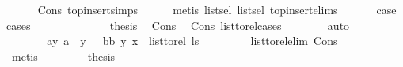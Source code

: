 \begin{isabellebody}
\ \ \ \ \isamarkupfalse%
\ Cons{\isacharparenleft}{\kern0pt}{}{\isacharparenright}{\kern0pt}\ top{\isacharunderscore}{\kern0pt}insert{\isachardot}{\kern0pt}simps\isanewline
\ \ \ \ \isamarkupfalse%
\ {\isacharparenleft}{\kern0pt}metis\ list{\isachardot}{\kern0pt}sel{\isacharparenleft}{\kern0pt}{}{\isacharparenright}{\kern0pt}\ list{\isachardot}{\kern0pt}sel{\isacharparenleft}{\kern0pt}{}{\isacharparenright}{\kern0pt}\ top{\isacharunderscore}{\kern0pt}insert{\isachardot}{\kern0pt}elims{\isacharparenright}{\kern0pt}\ \isanewline
\ \ \isamarkupfalse%
\ \isamarkupfalse%
\ {\isacharquery}{\kern0pt}case\ \isamarkupfalse%
{\isacharparenleft}{\kern0pt}cases{\isacharparenright}{\kern0pt}\isanewline
\ \ \ \ \isamarkupfalse%
\ {}\isanewline
\ \ \ \ \isamarkupfalse%
\ \isamarkupfalse%
\ {\isacharquery}{\kern0pt}thesis\ \isamarkupfalse%
\ Cons{\isacharparenleft}{\kern0pt}{}{\isacharparenright}{\kern0pt}\ \isamarkupfalse%
\ Cons{\isacharparenleft}{\kern0pt}{}{\isacharparenright}{\kern0pt}\ list{\isacharunderscore}{\kern0pt}to{\isacharunderscore}{\kern0pt}rel{\isacharunderscore}{\kern0pt}cases\isanewline
\ \ \ \ \ \ \isamarkupfalse%
\ auto\isanewline
\ \ \isamarkupfalse%
\isanewline
\ \ \ \ \isamarkupfalse%
\ {}\isanewline
\ \ \ \ \isamarkupfalse%
\ \isamarkupfalse%
\ {\isacharparenleft}{\kern0pt}ay{\isacharparenright}{\kern0pt}\ {\isachardoublequoteopen}a\ {\isacharequal}{\kern0pt}\ y{\isachardoublequoteclose}\ {\isacharbar}{\kern0pt}\ \ {\isacharparenleft}{\kern0pt}bb{\isacharparenright}{\kern0pt}\ {\isachardoublequoteopen}{\isacharparenleft}{\kern0pt}y{\isacharcomma}{\kern0pt}\ x{\isacharparenright}{\kern0pt}\ {\isasymin}\ list{\isacharunderscore}{\kern0pt}to{\isacharunderscore}{\kern0pt}rel\ ls{}{\isachardoublequoteclose}\ \isanewline
\ \ \ \ \ \ \isamarkupfalse%
\ list{\isacharunderscore}{\kern0pt}to{\isacharunderscore}{\kern0pt}rel{\isacharunderscore}{\kern0pt}elim\ Cons{\isacharparenleft}{\kern0pt}{}{\isacharcomma}{\kern0pt}{}{\isacharparenright}{\kern0pt}\isanewline
\ \ \ \ \ \ \isamarkupfalse%
\ metis\ \isanewline
\ \ \ \ \isamarkupfalse%
\ \isamarkupfalse%
\ {\isacharquery}{\kern0pt}thesis\ \isamarkupfalse%

\end{isabellebody}
